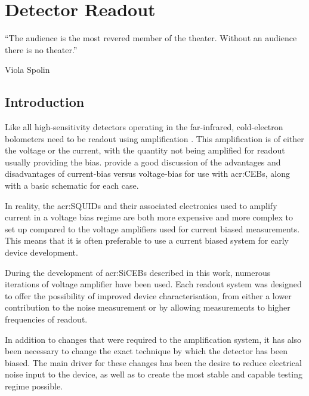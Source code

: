 \chapter{Detector Readout}
\label{cha:readout}
\epigraph{``The audience is the most revered member of the theater. Without an audience there is no theater.''}{\epiauthor Viola Spolin}
\section{Introduction}
\label{sec:readout-introduction}

Like all high-sensitivity detectors operating in the far-infrared, cold-electron bolometers need to be readout using amplification \parencite{Rieke2007}. This amplification is of either the voltage or the current, with the quantity not being amplified for readout usually providing the bias. \textcite{Golubev2001} provide a good discussion of the advantages and disadvantages of current-bias versus voltage-bias for use with \glspl{acr:CEB}, along with a basic schematic for each case.
\par 
In reality, the \glspl{acr:SQUID} and their associated electronics used to amplify current in a voltage bias regime are both more expensive and more complex to set up compared to the voltage amplifiers used for current biased measurements. This means that it is often preferable to use a current biased system for early device development.
\par 
During the development of \glspl{acr:SiCEB} described in this work, numerous iterations of voltage amplifier have been used. Each readout system was designed to offer the possibility of improved device characterisation, from either a lower contribution to the noise measurement or by allowing measurements to higher frequencies of readout.
\par
In addition to changes that were required to the amplification system, it has also been necessary to change the exact technique by which the detector has been biased. The main driver for these changes has been the desire to reduce electrical noise input to the device, as well as to create the most stable and capable testing regime possible.

